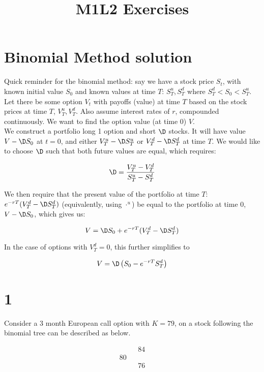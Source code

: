 \documentclass{article}
\begin{document}
	\title{M1L2 Exercises}
	\section*{Binomial Method solution}
	Quick reminder for the binomial method: say we have a stock price $S_t$, with known initial value $S_0$ and known values at time $T$: $S^u_T, S^d_T$ where $S^d_T < S_0 < S^u_T$. Let there be some option $V_t$ with payoffs (value) at time $T$ based on the stock prices at time $T$, $V^u_T, V^d_T$. Also assume interest rates of $r$, compounded continuously. We want to find the option value (at time 0) $V$.
	\\
	
	We construct a portfolio long 1 option and short $\D$ stocks. It will have value $V - \D S_0$ at $t=0$, and either $V_T^u - \D S_T^u$ or $V_T^d - \D S_T^d$ at time $T$. We would like to choose $\D$ such that both future values are equal, which requires:
	
	\begin{equation}\label{delta}
		\D = \frac{V^u_T - V^d_T}{S^u_T - S^d_T}
	\end{equation}
	
	We then require that the present value of the portfolio at time $T$: $e^{-rT}(V_T^d - \D S_T^d)$ (equivalently, using $\cdot^u$) be equal to the portfolio at time $0$, $V - \D S_0$, which gives us:
	
	\begin{equation}\label{full_solution}
		V = \D S_0 + e^{-rT}(V_T^d - \D S_T^d)
	\end{equation}
	
	In the case of options with $V^d_T = 0$, this further simplifies to
	
	\begin{equation}\label{cool_solution}
		V = \D \left( S_0 - e^{-rT} S_T^d\right)
	\end{equation}
	
	\section*{1}
	Consider a 3 month European call option with $K=79$, on a stock following the  binomial tree can be described as below.
	
	\begin{equation*}
		\begin{array}{ccc}
			   &   & 84 \\
			80 &   & \\
			   &   & 76
		\end{array}
	\end{equation*}
	
\end{document}
